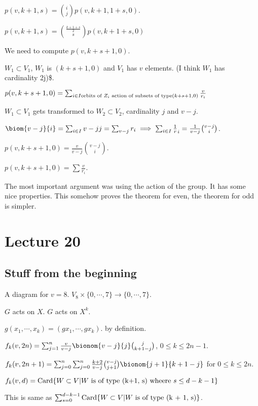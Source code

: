 \documentclass[11pt]{article}
\def\card{\operatorname{Card}}
\begin{document}
{{\(p(v, k+1, s) = \binom{i}{j} p(v, k+1, 1+s, 0)\).

\(p(v, k+1, s) = \binom{\frac{k+1 + s}{2}}{s} p(v, k+1 + s, 0)\)

We need to compute \(p(v, k+s + 1, 0)\).

\(W_1 \subset V_1\), \(W_1\) is \((k+s +1, 0)\) and \(V_1\) has \(v\) elements. (I
think \(W_1\) has cardinality 2j)\$.

\(p(v, k+s + 1, 0) = \sum_{i \in I \textup{orbits of }Z_i \textup{ action of
    subsets of type} (k+s + 1, 0)} \frac{v}{r_i}\)

\(W_1 \subset V_1\) gets transformed to \(W_2 \subset V_2\), cardinality \(j\) and
\(v-j\).

\(\biom{v-j}{i} = \sum_{i \in I} {v - j}{j} = \sum_{v - j }{r_i} \implies
    \sum_{i \in I}{\frac1r_i} = \frac{1}{v - j} \binom{v -j}{i}\).

\(p(v, k + s + 1, 0) = \frac{v}{v-j} \binom{v- j}{i}\).

\(p(v, k + s + 1, 0) = \sum {\frac{v}{r_i}}\).

The most important argument was using the action of the group. It has some
nice properties. This somehow proves the theorem for even, the theorem for
odd is simpler.
\section{Lecture 20}
\label{sec:org9304a46}
\subsection{Stuff from the beginning}
\label{sec:org39cd461}
A diagram for \(v = 8\). \(V_8 \times \{0, \cdots, 7\} \rightarrow \{0, \cdots,
   7\}\).

\(G\) acts on \(X\). \(G\) acts on \(X^k\).

\(g(x_1, \cdots, x_k) = (gx_1, \cdots, gx_k)\). by definition.

\(f_k(v, 2n) = \sum_{j =1}^{n} \frac{v}{v - j} \bionom{v-j}{j} \binom{j}{k +
   1 - j}\), \(0 \le k \le 2n -1\).

\(f_k(v, 2n+1) = \sum_{j = 0}^{n} \sum_{j = 0}^{n} \frac{k + 2}{v - j}
   \binom{v - j}{j+1} \bionom{j+1}{k+1 - j}\) for \(0 \le k \le 2n\).

\(f_k(v, d) = \card\{W \subset V \vert W \textup{ is of type (k+1, s) wheere }
   s \le d - k - 1\}\)

This is same as \(\sum_{s = 0}^{d - k - 1} \card\{W \subset V \vert W \textup{
   is of type (k + 1, s)}\}\).

}}
\end{document}

